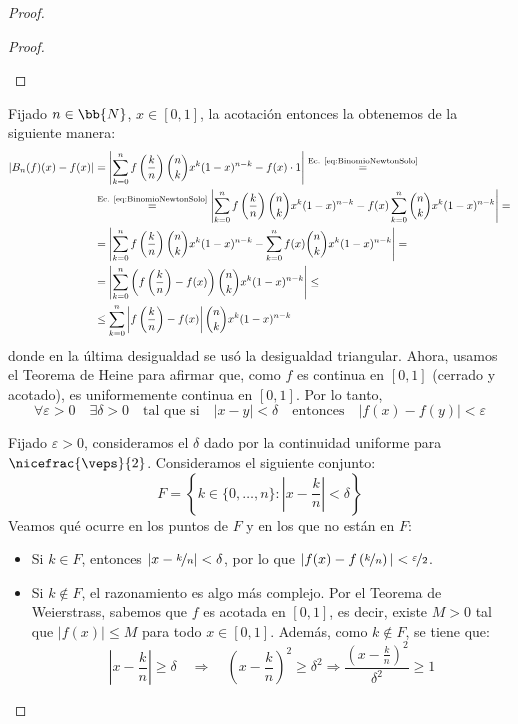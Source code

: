 \begin{proof}
\begin{lema}
\begin{proof}
\begin{enumerate}
            \end{enumerate}
        \end{proof}
    \end{lema}


    Fijado $n\in \bb{N}$, $x\in [0,1]$, la acotación entonces la obtenemos de la siguiente manera:
    \begin{align*}
        \left| B_n(f)(x) - f(x) \right|
        &= \left| \sum_{k=0}^n f\left(\frac{k}{n}\right)\binom{n}{k} x^k(1-x)^{n-k} - f(x)\cdot 1 \right| \stackrel{\text{Ec. \ref{eq:BinomioNewtonSolo}}}{=}\\
        &\stackrel{\text{Ec. \ref{eq:BinomioNewtonSolo}}}{=} \left| \sum_{k=0}^n f\left(\frac{k}{n}\right)\binom{n}{k} x^k(1-x)^{n-k} - f(x)\sum_{k=0}^n \binom{n}{k} x^k(1-x)^{n-k} \right| =\\
        &= \left| \sum_{k=0}^n f\left(\frac{k}{n}\right)\binom{n}{k} x^k(1-x)^{n-k} - \sum_{k=0}^n f(x)\binom{n}{k} x^k(1-x)^{n-k} \right| =\\
        &= \left| \sum_{k=0}^n \left( f\left(\frac{k}{n}\right) - f(x) \right)\binom{n}{k} x^k(1-x)^{n-k} \right| \leq\\
        &\leq \sum_{k=0}^n \left| f\left(\frac{k}{n}\right) - f(x) \right|\binom{n}{k} x^k(1-x)^{n-k}
    \end{align*}
    donde en la última desigualdad se usó la desigualdad triangular. Ahora, usamos el Teorema de Heine
    para afirmar que, como $f$ es continua en $[0,1]$ (cerrado y acotado), es uniformemente continua en $[0,1]$. Por lo tanto,
    \begin{equation*}
        \forall \varepsilon>0\quad \exists \delta>0\quad \text{tal que si}\quad |x-y|<\delta\quad \text{entonces}\quad |f(x)-f(y)|<\varepsilon
    \end{equation*}

    Fijado $\varepsilon>0$, consideramos el $\delta$ dado por la continuidad uniforme para $\nicefrac{\veps}{2}$.
    Consideramos el siguiente conjunto:
    \begin{equation*}
        F = \left\{ k\in \{0,\dots,n\} : \left|x-\frac{k}{n}\right|<\delta \right\}
    \end{equation*}
    Veamos qué ocurre en los puntos de $F$ y en los que no están en $F$:
    \begin{itemize}
        \item Si $k\in F$, entonces $\left|x-\nicefrac{k}{n}\right|<\delta$, por lo que $|f(x)-f\left(\nicefrac{k}{n}\right)|<\nicefrac{\varepsilon}{2}$.
        \item Si $k\notin F$, el razonamiento es algo más complejo. Por el Teorema de Weierstrass,
        sabemos que $f$ es acotada en $[0,1]$, es decir, existe $M>0$ tal que $|f(x)|\leq M$ para todo $x\in [0,1]$.
        Además, como $k\notin F$, se tiene que:
        \begin{equation*}
            \left|x-\frac{k}{n}\right|\geq\delta\quad \Longrightarrow\quad \left(x-\frac{k}{n}\right)^2\geq\delta^2
            \Longrightarrow \dfrac{\left(x-\frac{k}{n}\right)^2}{\delta^2}\geq 1
        \end{equation*}


\end{itemize}
\end{proof}
